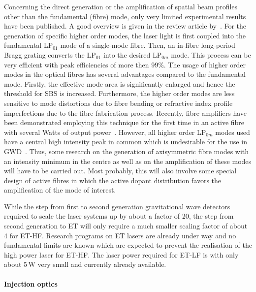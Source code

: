 Concerning the direct generation or the amplification of spatial beam profiles other than the fundamental (fibre) mode, only very limited experimental results have been published. A good overview is given in the review article by~\citet{Ramachandran2008}. For the generation of specific higher order modes, the laser light is first coupled into the fundamental LP$_{01}$ mode of a single-mode fibre. Then, an in-fibre long-period Bragg grating converts the LP$_{01}$ into the desired LP$_{0m}$ mode. This process can be very efficient with peak efficiencies of more then 99\%. The usage of higher order modes in the optical fibres has several advantages compared to the fundamental mode. Firstly, the effective mode area is significantly enlarged and hence the threshold for SBS is increased. Furthermore, the higher order modes are less sensitive to mode distortions due to fibre bending or refractive index profile imperfections due to the fibre fabrication process. Recently, fibre amplifiers have been demonstrated employing this technique for the first time in an active fibre with several Watts of output power~\cite{Nicholson2010a,Nicholson2010b}. However, all higher order LP$_{0m}$ modes used have a central high intensity peak in common which is undesirable for the use in GWD~\cite{Vinet2009}. Thus, some research on the generation of axisymmetric fibre modes with an intensity minimum in the centre as well as on the amplification of these modes will have to be carried out. Most probably, this will also involve some special design of active fibres in which the active dopant distribution favors the amplification of the mode of interest.

{
While the step from first to second generation gravitational wave detectors required
to scale the laser systems up by about a factor of 20, the step from second generation
to ET will only require a much smaller scaling factor of about 4 for ET-HF.
Research programs on ET lasers are already under way and no fundamental limits are known
which are expected to prevent the realisation of the high power laser for ET-HF.
The laser power
required for ET-LF is with only about 5\,W very small and currently already available.
}

\FloatBarrier
\paragraph{Injection optics}



